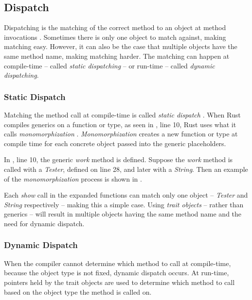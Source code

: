 \subsection{Dispatch}
Dispatching is the matching of the correct method to an object at method invocations \cite{driesen_95_01}.
Sometimes there is only one object to match against, making matching easy.
However, it can also be the case that multiple objects have the same method name, making matching harder.
The matching can happen at compile-time -- called \textit{static dispatching} -- or run-time -- called \textit{dynamic dispatching}.

\subsubsection{Static Dispatch}
Matching the method call at compile-time is called \textit{static dispatch} \cite{klabnik_2019_01, alexandrescu_01_01, abadi_12_01}.
When Rust compiles generics on a function or type, as seen in , line 10, Rust uses what it calls \textit{monomorphization} \cite{klabnik_2019_01}.
\textit{Monomorphization} creates a new function or type at compile time for each concrete object passed into the generic placeholders.

In , line 10, the generic \textit{work} method is defined.
Suppose the \textit{work} method is called with a \textit{Tester}, defined on line 28, and later with a \textit{String}.
Then an example of the \textit{monomorphization} process is shown in .


Each \textit{show} call in the expanded functions can match only one object -- \textit{Tester} and \textit{String} respectively -- making this a simple case.
Using \textit{trait objects} -- rather than generics -- will result in multiple objects having the same method name and the need for dynamic dispatch.

\subsubsection{Dynamic Dispatch}
When the compiler cannot determine which method to call at compile-time, because the object type is not fixed, dynamic dispatch \cite{alexandrescu_01_01, klabnik_2019_01, abadi_12_01} occurs.
At run-time, pointers held by the trait objects are used to determine which method to call \cite{klabnik_2019_01} based on the object type the method is called on.

